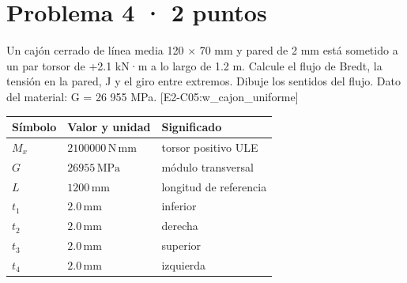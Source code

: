 \par\medskip\noindent\begin{minipage}{\linewidth}

\section{Problema 4 · 2 puntos}

Un cajón cerrado de línea media 120 \ensuremath{\times} 70 mm y pared de 2 mm está sometido a un par torsor de +2.1 kN·m a lo largo de 1.2 m. Calcule el flujo de Bredt, la tensión en la pared, J y el giro entre extremos. Dibuje los sentidos del flujo. Dato del material: G = 26 955 MPa. [E2-C05:w\_cajon\_uniforme]

\par\medskip\noindent\begin{tabular}{@{}p{.18\linewidth}p{.26\linewidth}p{.48\linewidth}@{}}
\toprule Símbolo & Valor y unidad & Significado\\\midrule
$M_{x}$ & $2100000\,\mathrm{N\,mm}$ & torsor positivo ULE\\
$G$ & $26955\,\mathrm{MPa}$ & módulo transversal\\
$L$ & $1200\,\mathrm{mm}$ & longitud de referencia\\
$t_{1}$ & $2.0\,\mathrm{mm}$ & inferior\\
$t_{2}$ & $2.0\,\mathrm{mm}$ & derecha\\
$t_{3}$ & $2.0\,\mathrm{mm}$ & superior\\
$t_{4}$ & $2.0\,\mathrm{mm}$ & izquierda\\
\bottomrule\end{tabular}\par\medskip


\end{minipage}
